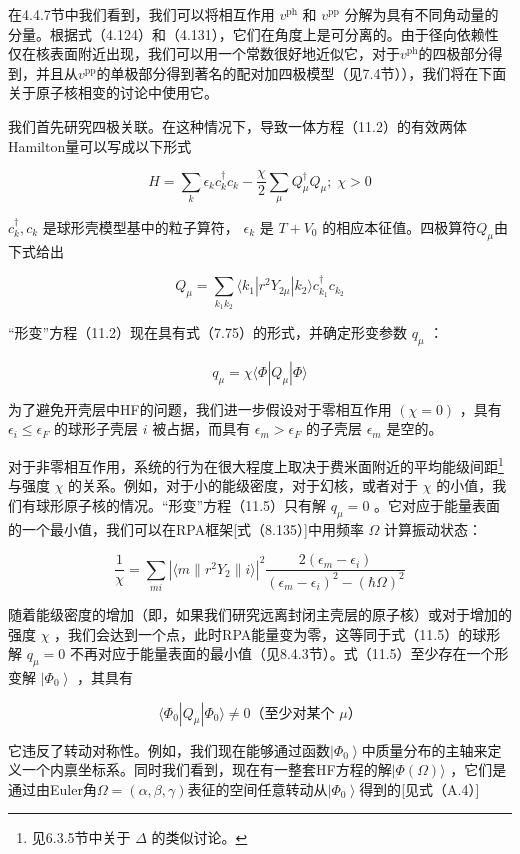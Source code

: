 在4.4.7节中我们看到，我们可以将相互作用 $v^{\text{ph}}$ 和 $v^{\text{pp}}$ 分解为具有不同角动量的分量。根据式（4.124）和（4.131），它们在角度上是可分离的。由于径向依赖性仅在核表面附近出现，我们可以用一个常数很好地近似它，对于$v^{\text{ph}}$的四极部分得到，并且从$v^{\text{pp}}$的单极部分得到著名的配对加四极模型（见7.4节）），我们将在下面关于原子核相变的讨论中使用它。

我们首先研究四极关联。在这种情况下，导致一体方程（11.2）的有效两体Hamilton量可以写成以下形式

\[
H=\sum_{k}\epsilon_{k}c^{\dagger}_{k}c_{k}-\frac{\chi}{2}\sum_{\mu}Q^{\dagger}_{\mu}Q_{\mu};\;\chi>0\tag{11.3}
\]

$c^{\dagger}_{k},c_{k}$ 是球形壳模型基中的粒子算符， $\epsilon_{k}$ 是 $T+V_{0}$
的相应本征值。四极算符$Q_{\mu}$由下式给出

\[
Q_{\mu}=\sum_{k_{1}k_{2}}\langle k_{1}|r^{2}Y_{2\mu}|k_{2}\rangle c^{\dagger}_{k_{1}}c_{k_{2}}\tag{11.4}
\]

“形变”方程（11.2）现在具有式（7.75）的形式，并确定形变参数 $q_{\mu}$ ：

\[
q_{\mu}=\chi\langle\Phi|Q_{\mu}|\Phi\rangle\tag{11.5}
\]

为了避免开壳层中HF的问题，我们进一步假设对于零相互作用 $\left(\chi=0\right)$ ，具有 $\epsilon_{i}\leq\epsilon_{F}$
的球形子壳层 $i$ 被占据，而具有 $\epsilon_{m}>\epsilon_{F}$ 的子壳层 $\epsilon_{m}$
是空的。

对于非零相互作用，系统的行为在很大程度上取决于费米面附近的平均能级间距\footnote{见6.3.5节中关于 $\Delta$ 的类似讨论。}
与强度 $\chi$ 的关系。例如，对于小的能级密度，对于幻核，或者对于 $\chi$ 的小值，我们有球形原子核的情况。“形变”方程（11.5）只有解
$q_{\mu}=0$ 。它对应于能量表面的一个最小值，我们可以在RPA框架{[}式（8.135）{]}中用频率 $\Omega$
计算振动状态：

\[
\frac{1}{\chi}=\sum_{mi}\left|\langle m\|r^{2}Y_{2}\|i\rangle\right|^{2}\frac{2(\epsilon_{m}-\epsilon_{i})}{(\epsilon_{m}-\epsilon_{i})^{2}-(\hbar\Omega)^{2}}\tag{11.6}
\]

随着能级密度的增加（即，如果我们研究远离封闭主壳层的原子核）或对于增加的强度 $\chi$ ，我们会达到一个点，此时RPA能量变为零，这等同于式（11.5）的球形解
${q}_{\mu}=0$ 不再对应于能量表面的最小值（见8.4.3节）。式（11.5）至少存在一个形变解 $\left|\Phi_{0}\right\rangle $
，其具有

\[
\langle\Phi_{0}|Q_{\mu}|\Phi_{0}\rangle\neq0\text{（至少对某个 }\mu\text{）}\tag{11.7}
\]

它违反了转动对称性。例如，我们现在能够通过函数$\left|{\Phi}_{0}\right\rangle $中质量分布的主轴来定义一个内禀坐标系。同时我们看到，现在有一整套HF方程的解$|\Phi\left(\Omega\right)\rangle$
，它们是通过由Euler角$\Omega=\left(\alpha,\beta,\gamma\right)$表征的空间任意转动从$\left|\Phi_{0}\right\rangle $得到的{[}见式（A.4）{]}

